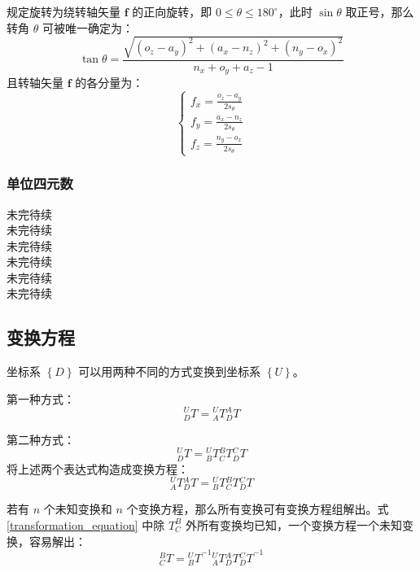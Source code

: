 \documentclass[cn,11pt,chinese,blue,bibstyle=ieeetr]{elegantbook}
\begin{document}
规定旋转为绕转轴矢量 $\bm{f}$ 的正向旋转，即 $0 \le \theta \le 180^{\circ}$，此时 $\sin\theta$ 取正号，那么转角 $\theta$ 可被唯一确定为：
\begin{equation}
\tan\theta = \frac{\sqrt{\left(o_z - a_y\right)^2 + \left(a_x - n_z\right)^2 + \left(n_y - o_x\right)^2}}{n_x + o_y + a_z - 1}
\end{equation}
且转轴矢量 $\bm{f}$ 的各分量为：
\begin{equation}
\left\{\begin{array}{c}
f_x = \frac{o_z - a_y}{2s_{\theta}} \\
f_y = \frac{a_x - n_z}{2s_{\theta}} \\
f_z = \frac{n_y - o_x}{2s_{\theta}}
\end{array}
\right.
\end{equation}


\subsubsection{单位四元数}

未完待续 \\
未完待续 \\
未完待续 \\
未完待续 \\
未完待续 \\
未完待续 \\


\subsection{变换方程}

坐标系 $\left\{D\right\}$ 可以用两种不同的方式变换到坐标系 $\left\{U\right\}$。

第一种方式：
$${_D^UT}={_A^UT}{_D^AT}$$

第二种方式：
$${_D^UT}={_B^UT}{_C^BT}{_D^CT}$$
将上述两个表达式构造成变换方程：
\begin{equation}\label{transformation_equation}
{_A^UT}{_D^AT}={_B^UT}{_C^BT}{_D^CT}
\end{equation}

若有 $n$ 个未知变换和 $n$ 个变换方程，那么所有变换可有变换方程组解出。式 \ref{transformation_equation} 中除 $T_C^B$ 外所有变换均已知，一个变换方程一个未知变换，容易解出：
\begin{equation}
_C^BT={_B^UT}^{-1}{ _A^UT}{_D^AT} {_D^CT}^{-1}
\end{equation}
\end{document}
